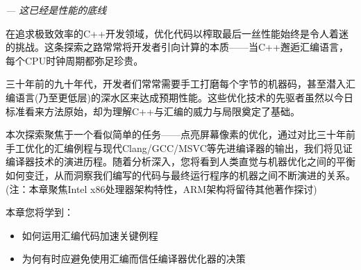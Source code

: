 \begin{flushright}
\textit{--- 这已经是性能的底线}
\end{flushright}

在追求极致效率的C++开发领域，优化代码以榨取最后一丝性能始终是令人着迷的挑战。这条探索之路常常将开发者引向计算的本质——当C++邂逅汇编语言，每个CPU时钟周期都弥足珍贵。

三十年前的九十年代，开发者们常常需要手工打磨每个字节的机器码，甚至潜入汇编语言(乃至更低层)的深水区来达成预期性能。这些优化技术的先驱者虽然以今日标准看来方法原始，却为理解C++与汇编的威力与局限奠定了基础。

本次探索聚焦于一个看似简单的任务——点亮屏幕像素的优化，通过对比三十年前手工优化的汇编例程与现代Clang/GCC/MSVC等先进编译器的输出，我们将见证编译器技术的演进历程。随着分析深入，您将看到人类直觉与机器优化之间的平衡如何变迁，从而洞察我们编写的代码与最终运行程序的机器之间不断演进的关系。(注：本章聚焦Intel x86处理器架构特性，ARM架构将留待其他著作探讨)

本章您将学到：

\begin{itemize}
\item 
如何运用汇编代码加速关键例程

\item 
为何有时应避免使用汇编而信任编译器优化器的决策
\end{itemize}


